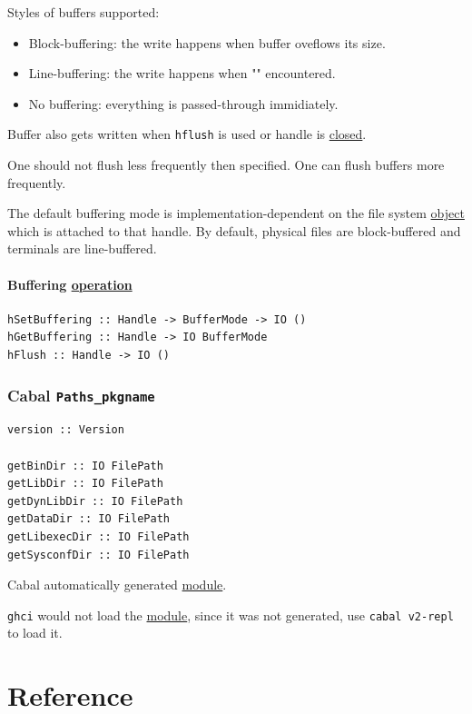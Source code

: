 \documentclass[a4paper,14pt,oneside]{book}
\begin{document}
Styles of buffers supported:

\begin{itemize}
\item Block-buffering: the write happens when buffer oveflows its size.
\item Line-buffering: the write happens when "\n" encountered.
\item No buffering: everything is passed-through immidiately.
\end{itemize}

Buffer also gets written when \texttt{hflush} is used or handle is \hyperref[org2fc158d]{closed}.

One should not flush less frequently then specified.
One can flush buffers more frequently.

The default buffering mode is implementation-dependent on the file system \hyperref[orgd191004]{object} which is attached to that handle. By default, physical files are block-buffered and terminals are line-buffered.

\subsection{Buffering \hyperref[orgf17bdac]{operation}}
\label{sec:orgc0f6f1e}

\begin{verbatim}
hSetBuffering :: Handle -> BufferMode -> IO ()
hGetBuffering :: Handle -> IO BufferMode
hFlush :: Handle -> IO ()
\end{verbatim}

\section{Cabal \texttt{Paths\_pkgname}}
\label{sec:orgfda8ea5}

\begin{verbatim}
version :: Version

getBinDir :: IO FilePath
getLibDir :: IO FilePath
getDynLibDir :: IO FilePath
getDataDir :: IO FilePath
getLibexecDir :: IO FilePath
getSysconfDir :: IO FilePath
\end{verbatim}

Cabal automatically generated \hyperref[org0cae261]{module}.

\texttt{ghci} would not load the \hyperref[org0cae261]{module}, since it was not generated, use \texttt{cabal v2-repl} to load it.

\part{Reference}
\label{sec:orgba87eca}
\end{document}
